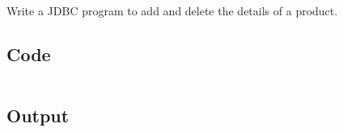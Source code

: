 \documentclass[../main.tex]{subfiles}
\begin{document}
Write a JDBC program to add and delete the details of a product.

\subsection{Code}
\inputminted[frame=lines, breaklines, breakanywhere, numberblanklines=false]{java}{./programs/prog24/Product.java}

\subsection{Output}
\end{document}
